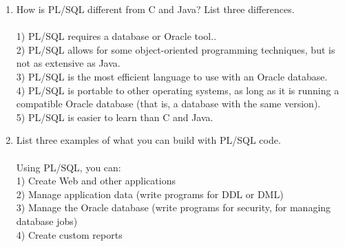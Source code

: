 \begin{enumerate}[1.]
	\item How is PL/SQL different from C and Java? List three differences. 
\\
\\1) PL/SQL requires a database or Oracle tool..
\\2) PL/SQL allows for some object-oriented programming techniques, but is not as
extensive as Java.
\\3) PL/SQL is the most efficient language to use with an Oracle database.
\\4) PL/SQL is portable to other operating systems, as long as it is running a
compatible Oracle database (that is, a database with the same version).
\\5) PL/SQL is easier to learn than C and Java. 
\\
	\item List three examples of what you can build with PL/SQL code. 
\\
\\Using PL/SQL, you can:
\\1) Create Web and other applications
\\2) Manage application data (write programs for DDL or DML)
\\3) Manage the Oracle database (write programs for security, for managing
database jobs)
\\4) Create custom reports
	

\end{enumerate} 
